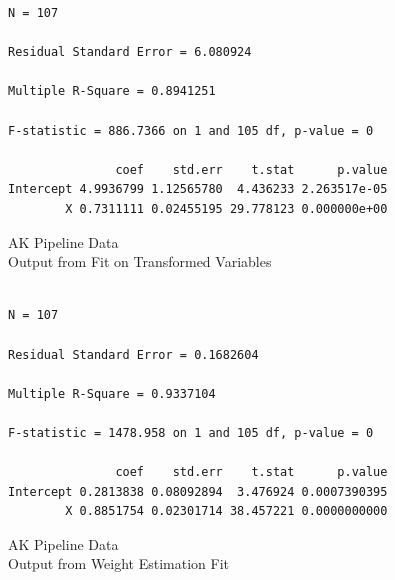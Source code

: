 {{{\begin{verbatim}
N = 107

Residual Standard Error = 6.080924

Multiple R-Square = 0.8941251

F-statistic = 886.7366 on 1 and 105 df, p-value = 0

               coef    std.err    t.stat      p.value 
Intercept 4.9936799 1.12565780  4.436233 2.263517e-05
        X 0.7311111 0.02455195 29.778123 0.000000e+00
\end{verbatim}
}
\clearpage
\begin{figure}
\end{figure}
\begin{figure}
\end{figure}
\begin{figure}
\end{figure}
\begin{figure}
\end{figure}
\begin{figure}
\end{figure}
\clearpage
\newpage
\begin{center}
AK Pipeline Data \\
Output from Fit on Transformed Variables
\end{center}
\vspace{0.5in}
{\large
\begin{verbatim}

N = 107

Residual Standard Error = 0.1682604

Multiple R-Square = 0.9337104

F-statistic = 1478.958 on 1 and 105 df, p-value = 0

               coef    std.err    t.stat      p.value 
Intercept 0.2813838 0.08092894  3.476924 0.0007390395
        X 0.8851754 0.02301714 38.457221 0.0000000000
\end{verbatim}
}
\clearpage
\begin{figure}
\end{figure}
\begin{figure}
\end{figure}
\begin{figure}
\end{figure}
\clearpage
\newpage
\begin{center}
AK Pipeline Data \\
Output from Weight Estimation Fit 
\end{center}
\vspace{0.5in}
{\large
\begin{verbatim}


\end{verbatim}}}}
